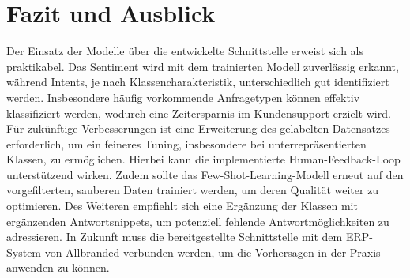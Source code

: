 \chapter{Fazit und Ausblick}

Der Einsatz der Modelle über die entwickelte Schnittstelle erweist sich als praktikabel. Das Sentiment
wird mit dem trainierten Modell zuverlässig erkannt, während Intents, je nach Klassencharakteristik,
unterschiedlich gut identifiziert werden. Insbesondere häufig vorkommende Anfragetypen können effektiv
klassifiziert werden, wodurch eine Zeitersparnis im Kundensupport erzielt wird. Für zukünftige Verbesserungen
ist eine Erweiterung des gelabelten Datensatzes erforderlich, um ein feineres Tuning, insbesondere bei
unterrepräsentierten Klassen, zu ermöglichen. Hierbei kann die implementierte Human-Feedback-Loop
unterstützend wirken. Zudem sollte das Few-Shot-Learning-Modell erneut auf den vorgefilterten, sauberen
Daten trainiert werden, um deren Qualität weiter zu optimieren. Des Weiteren empfiehlt sich eine Ergänzung
der Klassen mit ergänzenden Antwortsnippets, um potenziell fehlende Antwortmöglichkeiten zu adressieren.
In Zukunft muss die bereitgestellte Schnittstelle mit dem ERP-System von Allbranded verbunden werden, um die
Vorhersagen in der Praxis anwenden zu können. 